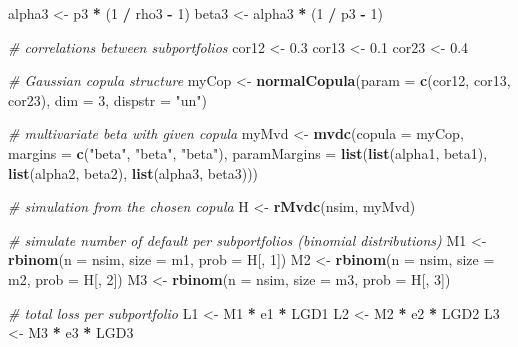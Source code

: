 \documentclass[
]{article}
\newenvironment{Shaded}{\begin{snugshade}}{\end{snugshade}}
\newcommand{\CommentTok}[1]{\textcolor[rgb]{0.56,0.35,0.01}{\textit{#1}}}
\newcommand{\DataTypeTok}[1]{\textcolor[rgb]{0.13,0.29,0.53}{#1}}
\newcommand{\DecValTok}[1]{\textcolor[rgb]{0.00,0.00,0.81}{#1}}
\newcommand{\FloatTok}[1]{\textcolor[rgb]{0.00,0.00,0.81}{#1}}
\newcommand{\KeywordTok}[1]{\textcolor[rgb]{0.13,0.29,0.53}{\textbf{#1}}}
\newcommand{\NormalTok}[1]{#1}
\newcommand{\OperatorTok}[1]{\textcolor[rgb]{0.81,0.36,0.00}{\textbf{#1}}}
\newcommand{\StringTok}[1]{\textcolor[rgb]{0.31,0.60,0.02}{#1}}
\begin{document}
\begin{Shaded}
\begin{Highlighting}[]
\NormalTok{  alpha3 <-}\StringTok{ }\NormalTok{p3 }\OperatorTok{*}\StringTok{ }\NormalTok{(}\DecValTok{1} \OperatorTok{/}\StringTok{ }\NormalTok{rho3 }\OperatorTok{-}\StringTok{ }\DecValTok{1}\NormalTok{)}
\NormalTok{  beta3 <-}\StringTok{ }\NormalTok{alpha3 }\OperatorTok{*}\StringTok{ }\NormalTok{(}\DecValTok{1} \OperatorTok{/}\StringTok{ }\NormalTok{p3 }\OperatorTok{-}\StringTok{ }\DecValTok{1}\NormalTok{)}
  
\CommentTok{# correlations between subportfolios}
\NormalTok{  cor12 <-}\StringTok{ }\FloatTok{0.3}
\NormalTok{  cor13 <-}\StringTok{ }\FloatTok{0.1}
\NormalTok{  cor23 <-}\StringTok{ }\FloatTok{0.4}
  
\CommentTok{# Gaussian copula structure}
\NormalTok{  myCop <-}\StringTok{ }\KeywordTok{normalCopula}\NormalTok{(}\DataTypeTok{param =} \KeywordTok{c}\NormalTok{(cor12, cor13, cor23), }\DataTypeTok{dim =} \DecValTok{3}\NormalTok{, }\DataTypeTok{dispstr =} \StringTok{"un"}\NormalTok{)}
  
\CommentTok{# multivariate beta with given copula}
\NormalTok{  myMvd <-}\StringTok{ }\KeywordTok{mvdc}\NormalTok{(}\DataTypeTok{copula =}\NormalTok{ myCop,}
                \DataTypeTok{margins =} \KeywordTok{c}\NormalTok{(}\StringTok{"beta"}\NormalTok{, }\StringTok{"beta"}\NormalTok{, }\StringTok{"beta"}\NormalTok{),}
                \DataTypeTok{paramMargins =} \KeywordTok{list}\NormalTok{(}\KeywordTok{list}\NormalTok{(alpha1, beta1),}
                                    \KeywordTok{list}\NormalTok{(alpha2, beta2),}
                                    \KeywordTok{list}\NormalTok{(alpha3, beta3)))}

\CommentTok{# simulation from the chosen copula}
\NormalTok{  H <-}\StringTok{ }\KeywordTok{rMvdc}\NormalTok{(nsim, myMvd)}
  
\CommentTok{# simulate number of default per subportfolios (binomial distributions)}
\NormalTok{  M1 <-}\StringTok{ }\KeywordTok{rbinom}\NormalTok{(}\DataTypeTok{n =}\NormalTok{ nsim, }\DataTypeTok{size =}\NormalTok{ m1, }\DataTypeTok{prob =}\NormalTok{ H[, }\DecValTok{1}\NormalTok{])}
\NormalTok{  M2 <-}\StringTok{ }\KeywordTok{rbinom}\NormalTok{(}\DataTypeTok{n =}\NormalTok{ nsim, }\DataTypeTok{size =}\NormalTok{ m2, }\DataTypeTok{prob =}\NormalTok{ H[, }\DecValTok{2}\NormalTok{])}
\NormalTok{  M3 <-}\StringTok{ }\KeywordTok{rbinom}\NormalTok{(}\DataTypeTok{n =}\NormalTok{ nsim, }\DataTypeTok{size =}\NormalTok{ m3, }\DataTypeTok{prob =}\NormalTok{ H[, }\DecValTok{3}\NormalTok{])}
  
\CommentTok{# total loss per subportfolio}
\NormalTok{  L1 <-}\StringTok{ }\NormalTok{M1 }\OperatorTok{*}\StringTok{ }\NormalTok{e1 }\OperatorTok{*}\StringTok{ }\NormalTok{LGD1}
\NormalTok{  L2 <-}\StringTok{ }\NormalTok{M2 }\OperatorTok{*}\StringTok{ }\NormalTok{e2 }\OperatorTok{*}\StringTok{ }\NormalTok{LGD2}
\NormalTok{  L3 <-}\StringTok{ }\NormalTok{M3 }\OperatorTok{*}\StringTok{ }\NormalTok{e3 }\OperatorTok{*}\StringTok{ }\NormalTok{LGD3}
  

\end{Highlighting}
\end{Shaded}
\end{document}
